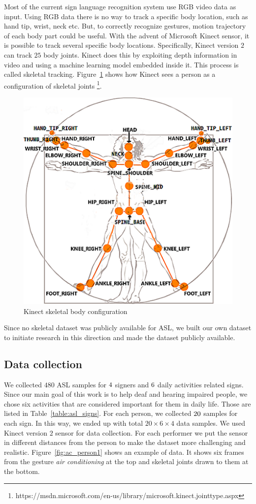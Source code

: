 \documentclass[10pt,twocolumn,letterpaper]{article}
\begin{document}
Most of the current sign language recognition system use RGB video data as input. Using RGB data there is no way to track a specific body location, such as hand tip, wrist, neck etc. But, to correctly recognize gestures, motion trajectory of each body part could be useful. With the advent of Microsoft Kinect sensor, it is possible to track several specific body locations. Specifically, Kinect version $2$ can track $25$ body joints. Kinect does this by exploiting depth information in video and using a machine learning model embedded inside it. This process is called skeletal tracking. Figure~\ref{fig:kinect_sk} shows how Kinect sees a person as a configuration of skeletal joints \footnote{https://msdn.microsoft.com/en-us/library/microsoft.kinect.jointtype.aspx}. 
\begin{figure}[h]
	\begin{center}
		\includegraphics[width=.8\linewidth]{kinect_sk}
	\end{center}
	\caption{Kinect skeletal body configuration}
	\label{fig:kinect_sk}
\end{figure}
Since no skeletal dataset was publicly available for ASL, we built our own dataset to initiate research in this direction and made the dataset publicly available.  
\subsection{Data collection}
We collected $480$ ASL samples for $\number4$ signers and $\number6$ daily activities related signs. Since our main goal of this work is to help deaf and hearing impaired people, we chose six activities that are considered important for them in daily life. Those are listed in Table~\ref{table:asl_signs}. For each person, we collected $\number20$ samples for each sign. In this way, we ended up with total $20 \times 6 \times 4$ data samples. We used Kinect version $2$ sensor for data collection. For each performer we put the sensor in different distances from the person to make the dataset more challenging and realistic. Figure~\ref{fig:ac_person1} shows an example of data. It shows six frames from the gesture \textit{air conditioning} at the top and skeletal joints drawn to them at the bottom.
\end{document}
